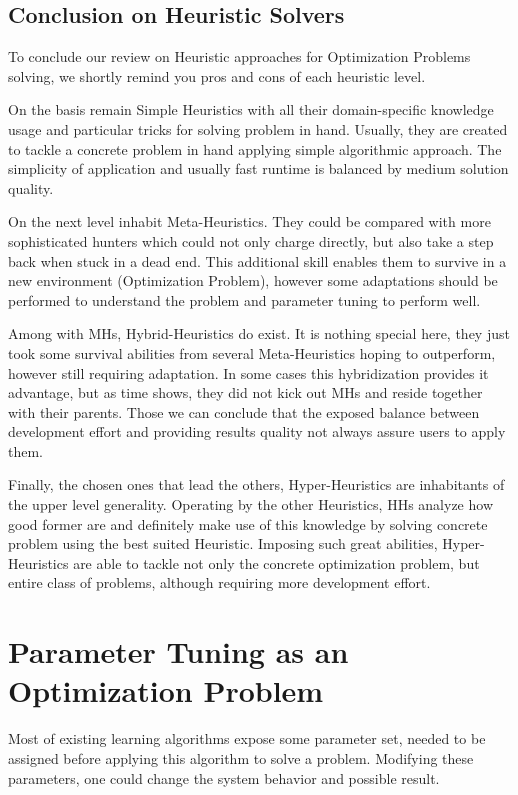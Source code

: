 \subsection{Conclusion on Heuristic Solvers}
To conclude our review on Heuristic approaches for Optimization Problems solving, we shortly remind you pros and cons of each heuristic level.

On the basis remain Simple Heuristics with all their domain-specific knowledge usage and particular tricks for solving problem in hand. Usually, they are created to tackle a concrete problem in hand applying simple algorithmic approach. The simplicity of application and usually fast runtime is balanced by medium solution quality.

On the next level inhabit Meta-Heuristics. They could be compared with more sophisticated hunters which could not only charge directly, but also take a step back when stuck in a dead end. This additional skill enables them to survive in a new environment (Optimization Problem), however some adaptations should be performed to understand the problem and parameter tuning to perform well.

Among with MHs, Hybrid-Heuristics do exist. It is nothing special here, they just took some survival abilities from several Meta-Heuristics hoping to outperform, however still requiring adaptation. In some cases this hybridization provides it advantage, but as time shows, they did not kick out MHs and reside together with their parents. Those we can conclude that the exposed balance between development effort and providing results quality not always assure users to apply them.

Finally, the chosen ones that lead the others, Hyper-Heuristics are inhabitants of the upper level generality. 
Operating by the other Heuristics, HHs analyze how good former are and definitely make use of this knowledge by solving concrete problem using the best suited Heuristic.
Imposing such great abilities, Hyper-Heuristics are able to tackle not only the concrete optimization problem, but entire class of problems, although requiring more development effort.


\section{Parameter Tuning as an Optimization Problem}\label{bg: parameter tuning}
Most of existing learning algorithms expose some parameter set, needed to be assigned before applying this algorithm to solve a problem. Modifying these parameters, one could change the system behavior and possible result.

